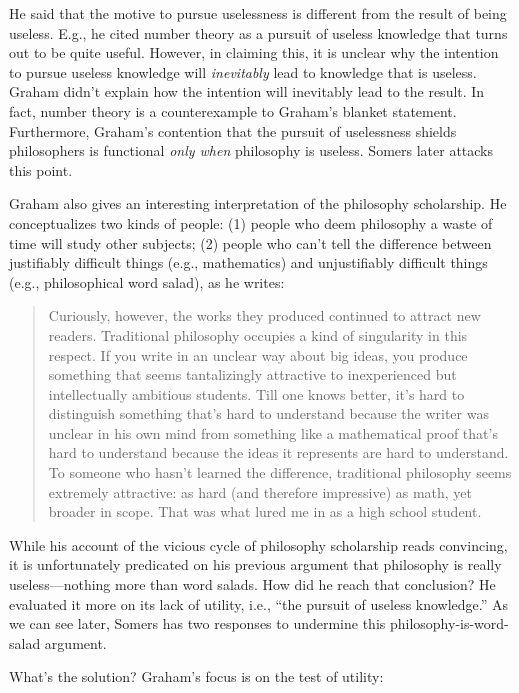 \documentclass[12pt]{article}
\begin{document}
He said that the motive to pursue uselessness is different from the result of being useless. E.g., he cited number theory as a pursuit of useless knowledge that turns out to be quite useful. However, in claiming this, it is unclear why the intention to pursue useless knowledge will \emph{inevitably} lead to knowledge that is useless. Graham didn't explain how the intention will inevitably lead to the result. In fact, number theory is a counterexample to Graham's blanket statement. Furthermore, Graham's contention that the pursuit of uselessness shields philosophers is functional \emph{only when} philosophy is useless. Somers later attacks this point.

Graham also gives an interesting interpretation of the philosophy scholarship. He conceptualizes two kinds of people: (1) people who deem philosophy a waste of time will study other subjects; (2) people who can't tell the difference between justifiably difficult things (e.g., mathematics) and unjustifiably difficult things (e.g., philosophical word salad), as he writes:

\begin{quotation}
 Curiously, however, the works they produced continued to attract new readers. Traditional philosophy occupies a kind of singularity in this respect. If you write in an unclear way about big ideas, you produce something that seems tantalizingly attractive to inexperienced but intellectually ambitious students. Till one knows better, it's hard to distinguish something that's hard to understand because the writer was unclear in his own mind from something like a mathematical proof that's hard to understand because the ideas it represents are hard to understand. To someone who hasn't learned the difference, traditional philosophy seems extremely attractive: as hard (and therefore impressive) as math, yet broader in scope. That was what lured me in as a high school student.
\end{quotation}

While his account of the vicious cycle of philosophy scholarship reads convincing, it is unfortunately predicated on his previous argument that philosophy is really useless---nothing more than word salads. How did he reach that conclusion? He evaluated it more on its lack of utility, i.e., \enquote{the pursuit of useless knowledge.} As we can see later, Somers has two responses to undermine this philosophy-is-word-salad argument.

What's the solution? Graham's focus is on the test of utility:
\end{document}

